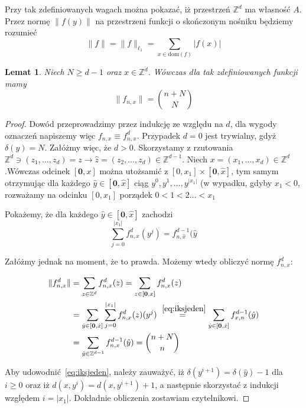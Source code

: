 \documentclass[licencjacka]{pracamgr}
\theoremstyle{definition}
\theoremstyle{definition}
\theoremstyle{definition}
\theoremstyle{definition}
\theoremstyle{definition}
\theoremstyle{plain}
\newtheorem{lemma}{Lemat}[section]
\theoremstyle{plain}
\begin{document}
Przy tak zdefiniowanych wagach można pokazać, iż przestrzeń $ \mathbb{Z}^d $ ma własność 
$ A $. Przez normę $ \| f(y)\| $ na przestrzeni funkcji o skończonym 
nośniku będziemy rozumieć 
$$ \| f \| = \| f \|_{\ell_1} = \sum\limits_{x \in \text{dom}(f)} |f(x)| $$

\begin{lemma}
	Niech $ N \geq d - 1 $ oraz $ x \in \mathbb{Z}^d $. Wówczas dla tak zdefiniowanych funkcji 
	mamy $$ \| f_{n,x}\|  = { n + N \choose N}$$
\end{lemma}
\begin{proof}
	Dowód przeprowadzimy przez indukcję ze względu na $ d $, dla wygody oznaczeń napiszemy 
	więc $ f_{n,x} \equiv f_{n,x}^d $. Przypadek $ d = 0 $ jest trywialny, gdyż 
	$ \delta(y) = N $. Załóżmy więc, że $ d > 0 $. Skorzystamy z rzutowania 
	$ \mathbb{Z}^d \ni (z_1, \dots, z_d) = z \rightarrow \hat z = (z_2, \dots, z_d) \in 
	\mathbb{Z}^{d-1} $.
	Niech $ x = (x_1, \dots, x_d) \in \mathbb{Z}^d $.Wówczas odcinek 
	$ [\textbf{0}, x]$ można utożsamić z $[0,x_1] \times [\textbf{0}, \hat x] $, tym 
	samym otrzymując dla każdego $ \hat y \in [\textbf{0}, \hat x] $ ciąg 
	$ y^0, y^1, \dots, y^{|x_1|} $ (w wypadku, gdyby $ x_1 < 0 $, rozważamy na odcinku 
	$ [0,x_1] $ porządek $ 0 < 1 < 2 \dots <x_1 $

	Pokażemy, że dla każdego $ \hat y \in [\textbf{0}, \hat x] $ zachodzi 
	\begin{equation} \label{eq:iksjeden}
	\sum\limits_{j = 0}^{|x_1|} f_{n,x}^d(y^j) = f^{d-1}_{n,\hat x}(\hat y
	\end{equation}

	Załóżmy jednak na moment, że to prawda. Możemy wtedy obliczyć normę $ f_{n,x}^d $:

	\begin{align*}
		\| f^d_{n,x} \| & = \sum\limits_{z \in \mathbb{Z}^d}f^d_{n,x}(z) = 
		\sum\limits_{z \in [\textbf{0}, x]} f^d_{n,x} (z) \\
		& = \sum\limits_{\hat y \in [\textbf{0}, \hat x]} \sum\limits_{j = 0}^{|x_1|}
		f_{n,x}^d(z) (y^j) \stackrel{~\ref{eq:iksjeden}}{=} \sum\limits_{\hat y 
		\in [\textbf{0}, \hat x]} f^{d-1}_{x,n} (\hat y) \\
		& = \sum\limits_{\hat y \in \mathbb{Z}^{d-1}} f_{n,x}^{d-1} (\hat y) = 
		{n + N \choose n} 
	\end{align*}

	Aby udowodnić~\ref{eq:iksjeden}, należy zauważyć, iż 
	$ \delta (y^{i+1}) = \delta(\hat y) - 1 $ dla $ i \geq 0 $ oraz iż $ d(x,y^i) = 
	d(x, y^{i+1}) + 1 $, a następnie skorzystać z indukcji względem $ i = |x_1|$. 
	Dokładnie obliczenia zostawiam czytelnikowi.
\end{proof}
\end{document}
